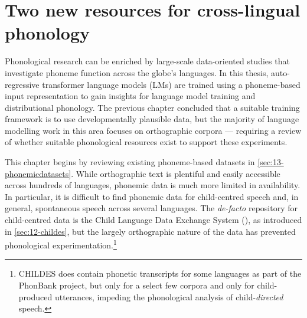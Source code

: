 \chapter{Two new resources for cross-lingual phonology}\label{chapter:resources}



Phonological research can be enriched by large-scale data-oriented studies that investigate phoneme function across the globe's languages. In this thesis, auto-regressive transformer language models (LMs) are trained using a phoneme-based input representation to gain insights for language model training and distributional phonology. The previous chapter concluded that a suitable training framework is to use developmentally plausible data, but the majority of language modelling work in this area focuses on orthographic corpora --- requiring a review of whether suitable phonological resources exist to support these experiments.


This chapter begins by reviewing existing phoneme-based datasets in \cref{sec:13-phonemicdatasets}. While orthographic text is plentiful and easily accessible across hundreds of languages, phonemic data is much more limited in availability. In particular, it is difficult to find phonemic data for child-centred speech and, in general, spontaneous speech across several languages. The \emph{de-facto} repository for child-centred data is the Child Language Data Exchange System (\childes), as introduced in \cref{sec:12-childes}, but the largely orthographic nature of the data has prevented phonological experimentation.\footnote{CHILDES does contain phonetic transcripts for some languages as part of the PhonBank project, but only for a select few corpora and only for child-produced utterances, impeding the phonological analysis of child-\emph{directed} speech.} 

